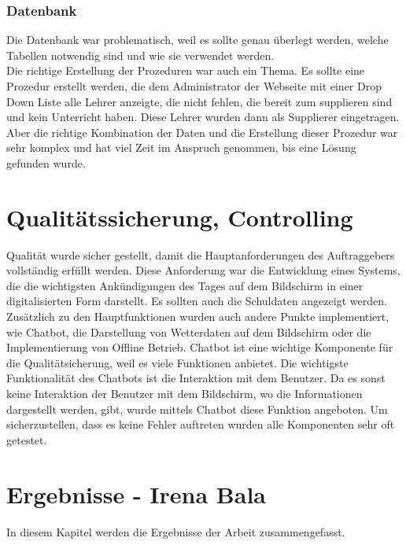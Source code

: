 \subsubsection{Datenbank}

Die Datenbank war problematisch, weil es sollte genau überlegt werden, welche Tabellen notwendig sind und wie sie verwendet werden. \\
Die richtige Erstellung der Prozeduren war auch ein Thema. Es sollte eine Prozedur erstellt werden, die dem Administrator der Webseite mit einer Drop Down Liste alle Lehrer anzeigte, die nicht fehlen, die bereit zum supplieren sind und kein Unterricht haben. Diese Lehrer wurden dann als Supplierer eingetragen. Aber die richtige Kombination der Daten und die Erstellung dieser Prozedur war sehr komplex und hat viel Zeit im Anspruch genommen, bis eine Lösung gefunden wurde. 

\section{Qualitätssicherung, Controlling}
Qualität wurde sicher gestellt, damit die Hauptanforderungen des Auftraggebers vollständig erfüllt werden. Diese Anforderung war die Entwicklung eines Systems, die die wichtigsten Ankündigungen des Tages auf dem Bildschirm in einer digitalisierten Form darstellt. Es sollten auch die Schuldaten angezeigt werden. \\
Zusätzlich zu den Hauptfunktionen wurden auch andere Punkte implementiert, wie Chatbot, die Darstellung von Wetterdaten auf dem Bildschirm oder die Implementierung von Offline Betrieb. Chatbot ist eine wichtige Komponente für die Qualitätsicherung, weil es viele Funktionen anbietet. Die wichtigste Funktionalit\"at des Chatbots ist die Interaktion mit dem Benutzer. Da es sonst keine Interaktion der Benutzer mit dem Bildschirm, wo die Informationen dargestellt werden, gibt, wurde mittels Chatbot diese Funktion angeboten. 
Um sicherzustellen, dass es keine Fehler auftreten wurden alle Komponenten sehr oft getestet.  

\section{Ergebnisse - Irena Bala}
In diesem Kapitel werden die Ergebnisse der Arbeit zusammengefasst.
